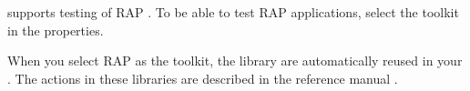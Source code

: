 \app{} supports testing of RAP \gdauts{}. To be able to test RAP applications, select the  toolkit in the \gdproject{} properties. 

When you select RAP as the \gdproject{} toolkit, the library \gdproject{}  are automatically reused in your \gdproject{}. The actions in these libraries are described in the reference manual .
